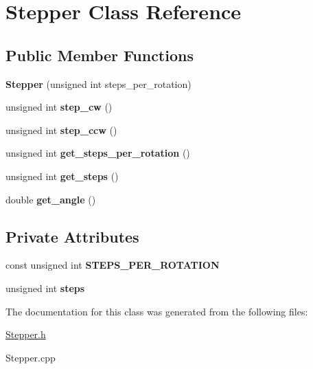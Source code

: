 \hypertarget{classStepper}{}\section{Stepper Class Reference}
\label{classStepper}
\subsection*{Public Member Functions}
\begin{DoxyCompactItemize}
\item 
\mbox{\label{classStepper_a682aec6af2ba4133fe2cc2a67e20b3df}} 
{\bfseries Stepper} (unsigned int steps\+\_\+per\+\_\+rotation)
\item 
\mbox{\label{classStepper_a522e7b0d55b58ed78089f851a33528e1}} 
unsigned int {\bfseries step\+\_\+cw} ()
\item 
\mbox{\label{classStepper_a5ae62e12cdeda8abb31101a3ed197503}} 
unsigned int {\bfseries step\+\_\+ccw} ()
\item 
\mbox{\label{classStepper_a6ee964946a422a5697ab6fef02141347}} 
unsigned int {\bfseries get\+\_\+steps\+\_\+per\+\_\+rotation} ()
\item 
\mbox{\label{classStepper_a973f518cd9456ba7ba4d3bde172e0edd}} 
unsigned int {\bfseries get\+\_\+steps} ()
\item 
\mbox{\label{classStepper_a6ea2ddf5e31e81d22c07397480d84ec0}} 
double {\bfseries get\+\_\+angle} ()
\end{DoxyCompactItemize}
\subsection*{Private Attributes}
\begin{DoxyCompactItemize}
\item 
\mbox{\label{classStepper_aa5af68ce1cc5c8f76bb4b826277c2959}} 
const unsigned int {\bfseries S\+T\+E\+P\+S\+\_\+\+P\+E\+R\+\_\+\+R\+O\+T\+A\+T\+I\+ON}
\item 
\mbox{\label{classStepper_a070ae73434de1dd9c4d63aced92ef68a}} 
unsigned int {\bfseries steps}
\end{DoxyCompactItemize}


The documentation for this class was generated from the following files\+:\begin{DoxyCompactItemize}
\item 
\mbox{\hyperlink{Stepper_8h}{Stepper.\+h}}\item 
Stepper.\+cpp\end{DoxyCompactItemize}
